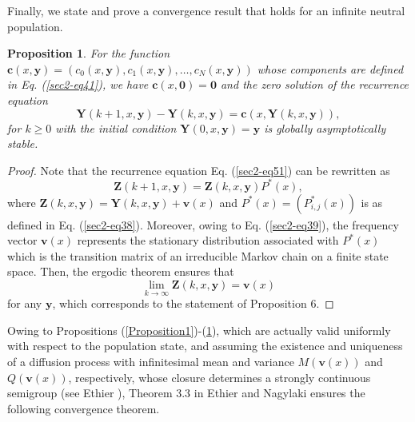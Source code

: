 \documentclass[11pt]{article}
\newtheorem{Proposition}{Proposition}
\begin{document}
Finally, we state and prove a convergence result that holds for an infinite neutral population. 

\begin{Proposition}\label{Proposition6}
For the function $\mathbf{c}(x, \mathbf{y})=(c_0(x, \mathbf{y}), c_1(x, \mathbf{y}), \ldots, c_N(x, \mathbf{y}))$ whose components are defined in Eq. (\ref{sec2-eq41}), we have $\mathbf{c}(x,\mathbf{0})=\mathbf{0}$ and the zero solution of the recurrence equation
\begin{equation}\label{sec2-eq51}
\mathbf{Y}(k+1,x,\mathbf{y})-\mathbf{Y}(k,x,\mathbf{y})=\mathbf{c}(x,\mathbf{Y}(k,x,\mathbf{y})),
\end{equation}
for $k\geq 0$ with the initial condition
$\mathbf{Y}(0,x,\mathbf{y})=\mathbf{y}$ is globally asymptotically stable.%
\end{Proposition}


\begin{proof}
Note that the recurrence equation Eq. (\ref{sec2-eq51}) can be rewritten as 
\begin{equation}\label{sec2-eq53}
\mathbf{Z}(k+1,x,\mathbf{y})=\mathbf{Z}(k,x,\mathbf{y})P^{*}(x),
\end{equation}
where $\mathbf{Z}(k,x,\mathbf{y})=\mathbf{Y}(k,x,\mathbf{y})+\mathbf{v}(x)$ and $P^{*}(x)=(P_{i,j}^{*}(x))_{}$ is as defined in Eq. (\ref{sec2-eq38}).
Moreover, owing to Eq. (\ref{sec2-eq39}), the frequency vector $\mathbf{v}(x)$ represents the stationary distribution associated with $P^{*}(x)$ which is the transition matrix of an irreducible Markov chain on a finite state space. Then, the ergodic theorem ensures that
\begin{equation}\label{sec2-eq54}
\lim_{k\rightarrow\infty}\mathbf{Z}(k,x,\mathbf{y})=\mathbf{v}(x)
\end{equation}
for any $\mathbf{y}$, which corresponds to the statement of Proposition 6.
\end{proof}





Owing to Propositions (\ref{Proposition1})-(\ref{Proposition6}), which are actually valid uniformly with respect to the population state, and assuming the existence and uniqueness of a diffusion process 
with infinitesimal mean and variance $M(\mathbf{v}(x))$ and $Q(\mathbf{v}(x))$, respectively, whose closure determines a strongly continuous semigroup (see Ethier \cite{E1976}), Theorem 3.3 in Ethier and Nagylaki \cite{EN1980} ensures the following convergence theorem.
\end{document}
